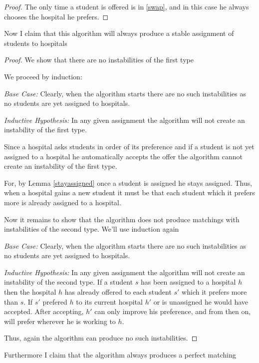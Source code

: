 \documentclass{article}
\begin{document}
\begin{proof}
The only time a student is offered is in \ref{swap}, and in this case he always chooses the hospital he prefers.
\end{proof}

Now I claim that this algorithm will always produce a stable assignment of students to hospitals

\begin{proof} We show that there are no instabilities of the first type

We proceed by induction:

\emph{Base Case:} Clearly, when the algorithm starts there are no such instabilities as no students are yet assigned to hospitals.

\emph{Inductive Hypothesis:} In any given assignment the algorithm will not create an instability of the first type.

Since a hospital asks students in order of its preference and if a student is not yet assigned to a hospital he automatically accepts the offer the algorithm cannot create an instability of the first type.

For, by Lemma \ref{stayassigned} once a student is assigned he stays assigned. Thus, when a hospital gains a new student it must be that each student which it prefers more is already assigned to a hospital.

Now it remains to show that the algorithm does not produce matchings with instabilities of the second type. We'll use induction again

\emph{Base Case:} Clearly, when the algorithm starts there are no such instabilities as no students are yet assigned to hospitals.

\emph{Inductive Hypothesis:} In any given assignment the algorithm will not create an instability of the second type. If a student $s$ has been assigned to a hospital $h$ then the hospital $h$ has already offered to each student $s'$ which it prefers more than $s$. If $s'$ prefered $h$ to its current hospital $h'$ or is unassigned he would have accepted. After accepting, $h'$ can only improve his preference, and from then on, will prefer wherever he is working to $h$.

Thus, again the algorithm can produce no such instabilities.
\end{proof}

Furthermore I claim that the algorithm always produces a perfect matching
\end{document}
